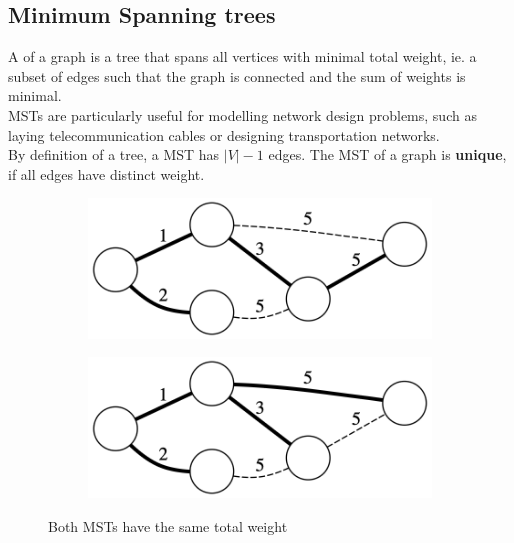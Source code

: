 \documentclass[a3paper, landscape, 11pt]{article} %
\begin{document}
\begin{multicols*}{4}
\newpage
{}
\subsection*{Minimum Spanning trees}

A  of a graph is a tree that spans all vertices with minimal total weight, ie. a subset of edges such that the graph is connected and the sum of weights is minimal.\\

MSTs are particularly useful for modelling network design problems, such as laying telecommunication cables or designing transportation networks.\\

By definition of a tree, a MST has $|V|-1$ edges. The MST of a graph is \textbf{unique}, if all edges have distinct weight.


\begin{figure}[H]
\centering
  \begin{subfigure}[b]{0.49\columnwidth}
    \includegraphics[width=1\textwidth]{images/mst-uniqueness-1.png}
    \label{fig:image8}
  \end{subfigure}
  \begin{subfigure}[b]{0.49\columnwidth}
    \includegraphics[width=1\textwidth]{images/mst-uniqueness-2.png}
    \label{fig:image8}
  \end{subfigure}
  \caption*{Both MSTs have the same total weight}
\end{figure}




\end{multicols*}
\end{document}
